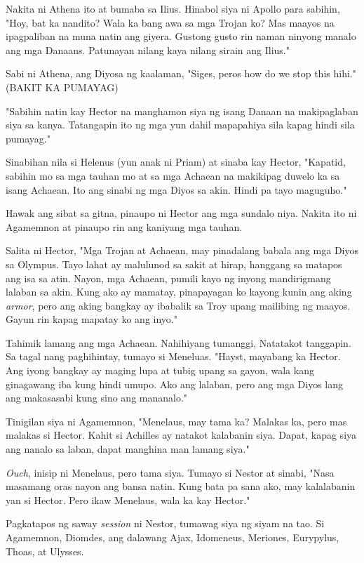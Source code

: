 \documentclass[12pt,letterpaper]{report}
\begin{document}
Nakita ni Athena ito at bumaba sa Ilius. Hinabol siya ni Apollo para sabihin, "Hoy, bat ka nandito? Wala ka bang awa sa mga Trojan ko? Mas maayos na ipagpaliban na muna natin ang giyera. Gustong gusto rin naman ninyong manalo ang mga Danaans. Patunayan nilang kaya nilang sirain ang Ilius."

Sabi ni Athena, ang Diyosa ng kaalaman, "Siges, peros how do we stop this hihi." (BAKIT KA PUMAYAG)

"Sabihin natin kay Hector na manghamon siya ng isang Danaan na makipaglaban siya sa kanya. Tatangapin ito ng mga yun dahil mapapahiya sila kapag hindi sila pumayag."

Sinabihan nila si Helenus (yun anak ni Priam) at sinaba kay Hector, "Kapatid, sabihin mo sa mga tauhan mo at sa mga Achaean na makikipag duwelo ka sa isang Achaean. Ito ang sinabi ng mga Diyos sa akin. Hindi pa tayo maguguho."

Hawak ang sibat sa gitna, pinaupo ni Hector ang mga sundalo niya. Nakita ito ni Agamemnon at pinaupo rin ang kaniyang mga tauhan.

Salita ni Hector, "Mga Trojan at Achaean, may pinadalang babala ang mga Diyos sa Olympus. Tayo lahat ay malulunod sa sakit at hirap, hanggang sa matapos ang isa sa atin. Nayon, mga Achaean, pumili kayo ng inyong mandirigmang lalaban sa akin. Kung ako ay mamatay, pinapayagan ko kayong kunin ang aking \textit{armor}, pero ang aking bangkay ay ibabalik sa Troy upang mailibing ng maayos. Gayun rin kapag mapatay ko ang inyo."

Tahimik lamang ang mga Achaean. Nahihiyang tumanggi, Natatakot tanggapin. Sa tagal nang paghihintay, tumayo si Meneluas. "Hayst, mayabang ka Hector. Ang iyong bangkay ay maging lupa at tubig upang sa gayon, wala kang ginagawang iba kung hindi umupo. Ako ang lalaban, pero ang mga Diyos lang ang makasasabi kung sino ang mananalo."

Tinigilan siya ni Agamemnon, "Menelaus, may tama ka? Malakas ka, pero mas malakas si Hector. Kahit si Achilles ay natakot kalabanin siya. Dapat, kapag siya ang nanalo sa laban, dapat manghina man lamang siya."

\textit{Ouch}, inisip ni Menelaus, pero tama siya. Tumayo si Nestor at sinabi, "Nasa masamang oras nayon ang bansa natin. Kung bata pa sana ako, may kalalabanin yan si Hector. Pero ikaw Menelaus, wala ka kay Hector."

Pagkatapos ng saway \textit{session} ni Nestor, tumawag siya ng siyam na tao. Si Agamemnon, Diomdes, ang dalawang Ajax, Idomeneus, Meriones, Eurypylus, Thoas, at Ulysses.
\end{document}
